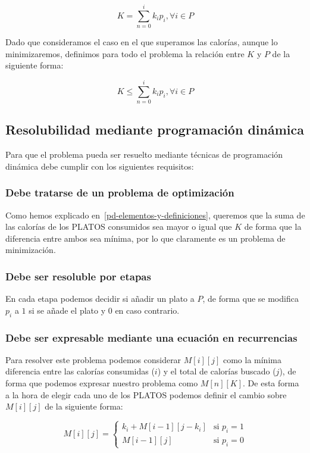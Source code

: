 \[K=\sum_{n=0}^{i}k_i p_i,\forall i\in P\]

Dado que consideramos el caso en el que superamos las calorías, aunque lo minimizaremos, definimos para todo el problema la relación entre $K$ y $P$ de la siguiente forma:

\[K\leq\sum_{n=0}^{i}k_i p_i,\forall i\in P\]

\subsection{Resolubilidad mediante programación dinámica}\label{pd-resolubilidad}

Para que el problema pueda ser resuelto mediante técnicas de programación dinámica debe cumplir con los siguientes requisitos:

\subsubsection{Debe tratarse de un problema de optimización}

Como hemos explicado en~\ref{pd-elementos-y-definiciones}, queremos que la suma de las calorías de los PLATOS consumidos sea mayor o igual que $K$ de forma que la diferencia entre ambos sea mínima, por lo que claramente es un problema de minimización.

\subsubsection{Debe ser resoluble por etapas}

En cada etapa podemos decidir si añadir un plato a $P$, de forma que se modifica $p_i$ a $1$ si se añade el plato y $0$ en caso contrario.

\subsubsection{Debe ser expresable mediante una ecuación en recurrencias}

Para resolver este problema podemos considerar $M[i][j]$ como la mínima diferencia entre las calorías consumidas ($i$) y el total de calorías buscado ($j$), de forma que podemos expresar nuestro problema como $M[n][K]$.
De esta forma a la hora de elegir cada uno de los PLATOS podemos definir el cambio sobre $M[i][j]$ de la siguiente forma:

\[
	M[i][j]=
	\begin{cases}
		k_i+M[i-1][j-k_i] & \text{si } p_i=1 \\
		M[i-1][j]         & \text{si } p_i=0
	\end{cases}
\]

